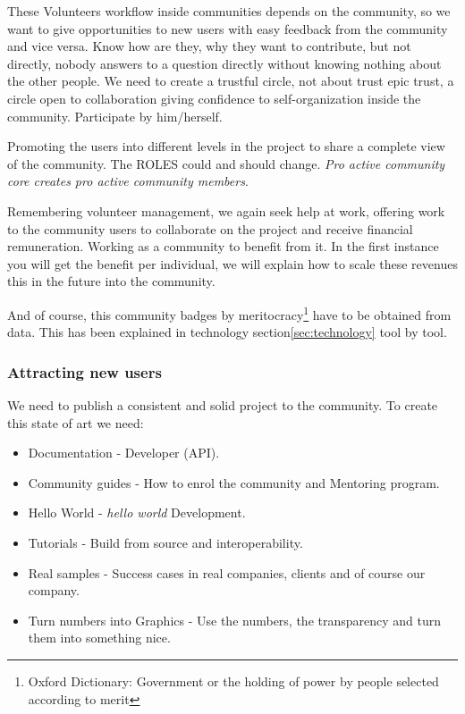 \documentclass[11pt]{scrartcl}
\begin{document}
\par These Volunteers workflow inside communities depends on the community, so we want to give opportunities to new users with easy feedback from the community and vice versa. Know how are they, why they want to contribute, but not directly, nobody answers to a question directly without knowing nothing about the other people. We need to create a trustful circle, not about trust epic trust, a circle open to collaboration giving confidence to self-organization inside the community. Participate by him/herself.

\par Promoting the users into different levels in the project to share a complete view of the community. The ROLES could and should change. \emph{Pro active community core creates pro active community members}.

\par Remembering volunteer management, we again seek help at work, offering work to the community users to collaborate on the project and receive financial remuneration. Working as a community to benefit from it. In the first instance you will get the benefit per individual, we will explain how to scale these revenues this in the future into the community.

\par And of course, this community badges by meritocracy\footnote{Oxford Dictionary: Government or the holding of power by people selected according to merit} have to be obtained from data. This has been explained in technology section\ref{sec:technology} tool by tool.


\subsubsection{Attracting new users}
\label{sub:new-users}

\par We need to publish a consistent and solid project to the community. To create this state of art we need:

\begin{itemize}
	\item Documentation - Developer (API). 
	\item Community guides - How to enrol the community and Mentoring program.
	\item Hello World - \emph{hello world} Development.
	\item Tutorials - Build from source and interoperability.
	\item Real samples - Success cases in real companies, clients and of course our company.
	\item Turn numbers into Graphics - Use the numbers, the transparency and turn them into something nice.
\end{itemize}
\end{document}
